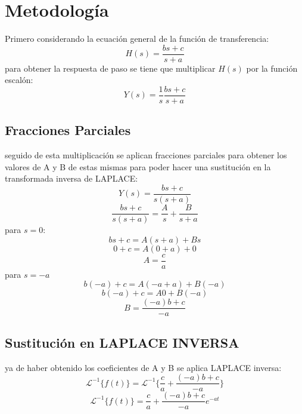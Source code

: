 \documentclass[12pt,a4paper]{report}
\begin{document}
\chapter{Metodología}
Primero considerando la ecuación general de la función de transferencia:
\begin{equation}
H(s)=\frac{bs+c}{s+a}
\end{equation}
para obtener la respuesta de paso se tiene que multiplicar $H(s)$ por la función escalón:
\begin{equation}
Y(s)=\frac{1}{s}\frac{bs+c}{s+a}
\end{equation}
\section{Fracciones Parciales}
seguido de esta multiplicación se aplican fracciones parciales para obtener los valores de A y B de estas mismas para poder hacer una sustitución en la transformada inversa de LAPLACE:
\begin{equation*}
Y(s)=\frac{bs+c}{s(s+a)}
\end{equation*}
\begin{equation*}
\frac{bs+c}{s(s+a)}=\frac{A}{s}+\frac{B}{s+a}
\end{equation*}
para $s=0$:
\begin{equation*}
bs+c=A(s+a)+Bs
\end{equation*}
\begin{equation*}
0+c=A(0+a)+0
\end{equation*}
\begin{equation*}
A=\frac{c}{a}
\end{equation*}
para $s=-a$
\begin{equation*}
b(-a)+c=A(-a+a)+B(-a)
\end{equation*}
\begin{equation*}
b(-a)+c=A0+B(-a)
\end{equation*}
\begin{equation*}
B=\frac{(-a)b+c}{-a}
\end{equation*}
\section{Sustitución en LAPLACE INVERSA}
ya de haber obtenido los coeficientes de A y B se aplica LAPLACE inversa:
\begin{equation}
\mathscr{L^{-1}}\{f(t)\} = \mathscr{L^{-1}}\{\frac{c}{a}+\frac{(-a)b+c}{-a}\} 
\end{equation}
\begin{equation}
\mathscr{L^{-1}}\{f(t)\} = \frac{c}{a}+\frac{(-a)b+c}{-a}e^{-at} 
\end{equation}
\end{document}
